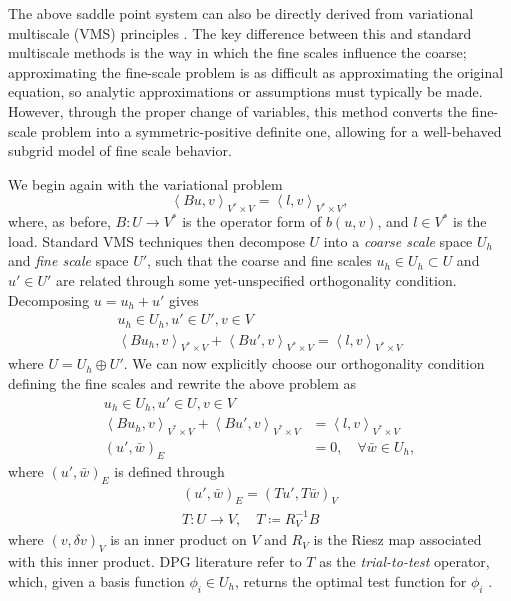 \documentclass[final,leqno]{siamltex}
\newcommand{\LRp}[1]{\left( #1 \right)}
\newcommand{\LRa}[1]{\left\langle #1 \right\rangle}
\begin{document}
The above saddle point system can also be directly derived from variational multiscale (VMS) principles \cite{VMS1,VMS2}.  The key difference between this and standard multiscale methods is the way in which the fine scales influence the coarse; approximating the fine-scale problem is as difficult as approximating the original equation, so analytic approximations or assumptions must typically be made.  However, through the proper change of variables, this method converts the fine-scale problem into a symmetric-positive definite one, allowing for a well-behaved subgrid model of fine scale behavior.

We begin again with the variational problem
\[
\LRa{Bu,v}_{V^*\times V} = \LRa{l,v}_{V^*\times V},
\]
where, as before, $B: U\rightarrow V^*$ is the operator form of $b(u,v)$, and $l \in V^*$ is the load.  Standard VMS techniques then decompose $U$ into a \textit{coarse scale} space $U_h$ and \textit{fine scale} space $U'$, such that the coarse and fine scales $u_h \in U_h \subset U$ and $u' \in U'$ are related through some yet-unspecified orthogonality condition.  Decomposing $u = u_h + u'$ gives 
\begin{align*}
u_h \in U_h, u' \in U', v \in V\\
\LRa{Bu_h,v}_{V^*\times V} + \LRa{Bu',v}_{V^*\times V} = \LRa{l,v}_{V^*\times V}
\end{align*}
where $U = U_h\oplus U'$.  We can now explicitly choose our orthogonality condition defining the fine scales and rewrite the above problem as 
\begin{align*}
u_h \in U_h, u' \in U, v \in V\\
\LRa{Bu_h,v}_{V^*\times V} + \LRa{Bu',v}_{V^*\times V} &= \LRa{l,v}_{V^*\times V}\\
\LRp{u',\bar{w}}_E &= 0, \quad \forall \bar{w} \in U_h,
\end{align*}
where $\LRp{u',\bar{w}}_E$ is defined through
\begin{align*}
\LRp{u',\bar{w}}_E = \LRp{Tu',T\bar{w}}_V\\
T:U\rightarrow V, \quad T \coloneqq R_V^{-1} B
\end{align*}
where $\LRp{v,\delta v}_V$ is an inner product on $V$ and $R_V$ is the Riesz map associated with this inner product.  DPG literature refer to $T$ as the \textit{trial-to-test} operator, which, given a basis function $\phi_i \in U_h$, returns the optimal test function for $\phi_i$ \cite{DPG2}.  
\end{document}

